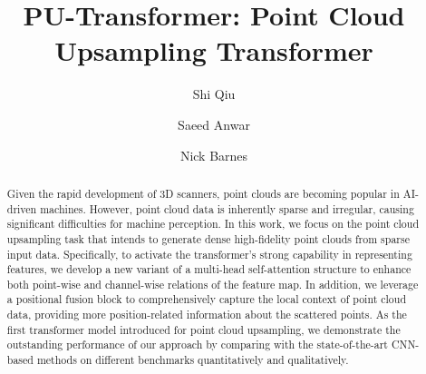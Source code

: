 \documentclass[runningheads]{llncs}
\begin{document}
\pagestyle{headings}
\mainmatter

\def\ACCV22SubNumber{478}  %

\title{PU-Transformer: Point Cloud Upsampling Transformer} %

%
\author{Shi Qiu \and
Saeed Anwar \and
Nick Barnes}
%
%
\maketitle

\begin{abstract}
Given the rapid development of 3D scanners, point clouds are becoming popular in AI-driven machines. However, point cloud data is inherently sparse and irregular, causing significant difficulties for machine perception. In this work, we focus on the point cloud upsampling task that intends to generate dense high-fidelity point clouds from sparse input data. Specifically, to activate the transformer's strong capability in representing features, we develop a new variant of a multi-head self-attention structure to enhance both point-wise and channel-wise relations of the feature map. In addition, we leverage a positional fusion block to comprehensively capture the local context of point cloud data, providing more position-related information about the scattered points. As the first transformer model introduced for point cloud upsampling, we demonstrate the outstanding performance of our approach by comparing with the state-of-the-art CNN-based methods on different benchmarks quantitatively and qualitatively.
\end{abstract}
\end{document}
